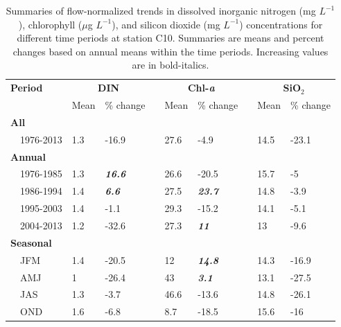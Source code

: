 \documentclass[letterpaper,12pt,oneside]{article}\usepackage[]{graphicx}\usepackage[]{color}
\begin{document}
\begin{table}[!tbp]
\caption{Summaries of flow-normalized trends in dissolved inorganic nitrogen (mg $L^{-1}$), chlorophyll ($\mu$g $L^{-1}$), and silicon dioxide (mg $L^{-1}$) concentrations for different time periods at station C10. Summaries are means and percent changes based on annual means within the time periods.  Increasing values are in bold-italics.\label{tab:c10chg}} 
\begin{center}
\begin{tabular}{lllcllcll}
\hline\hline
\multicolumn{1}{l}{\bfseries Period}&\multicolumn{2}{c}{\bfseries DIN}&\multicolumn{1}{c}{\bfseries }&\multicolumn{2}{c}{\bfseries Chl-\textit{a}}&\multicolumn{1}{c}{\bfseries }&\multicolumn{2}{c}{\bfseries SiO$_2$}\tabularnewline
\cline{2-3} \cline{5-6} \cline{8-9}
\multicolumn{1}{l}{}&\multicolumn{1}{c}{Mean}&\multicolumn{1}{c}{\% change}&\multicolumn{1}{c}{}&\multicolumn{1}{c}{Mean}&\multicolumn{1}{c}{\% change}&\multicolumn{1}{c}{}&\multicolumn{1}{c}{Mean}&\multicolumn{1}{c}{\% change}\tabularnewline
\hline
{\bfseries All}&&&&&&&&\tabularnewline
~~1976-2013&1.3&-16.9&&27.6&-4.9&&14.5&-23.1\tabularnewline
\hline
{\bfseries Annual}&&&&&&&&\tabularnewline
~~1976-1985&1.3&\textit{\textbf{16.6}}&&26.6&-20.5&&15.7&-5\tabularnewline
~~1986-1994&1.4&\textit{\textbf{6.6}}&&27.5&\textit{\textbf{23.7}}&&14.8&-3.9\tabularnewline
~~1995-2003&1.4&-1.1&&29.3&-15.2&&14.1&-5.1\tabularnewline
~~2004-2013&1.2&-32.6&&27.3&\textit{\textbf{11}}&&13&-9.6\tabularnewline
\hline
{\bfseries Seasonal}&&&&&&&&\tabularnewline
~~JFM&1.4&-20.5&&12&\textit{\textbf{14.8}}&&14.3&-16.9\tabularnewline
~~AMJ&1&-26.4&&43&\textit{\textbf{3.1}}&&13.1&-27.5\tabularnewline
~~JAS&1.3&-3.7&&46.6&-13.6&&14.8&-26.1\tabularnewline
~~OND&1.6&-6.8&&8.7&-18.5&&15.6&-16\tabularnewline
\hline
\end{tabular}\end{center}

\end{table}
\end{document}
